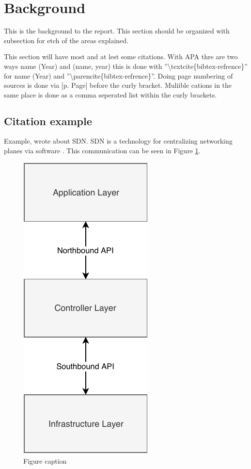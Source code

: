 
\section{Background}

This is the background to the report. This section should be organized with subsection for etch of the areas explained.

This section will have most and at lest some citations. With APA thre are two ways name (Year) and (name, year) this is done with ''\textbackslash textcite\{bibtex-refrence\}'' for name (Year) and ''\textbackslash parencite\{bibtex-refrence\}''. Doing page numbering of sources is done via [p. Page] before the curly bracket. Muliible cations in the same place is done as a comma seperated list within the curly brackets.




\subsection{Citation example}
Example, \textcite[p. 321]{ieeeSDN} wrote about SDN. SDN is a technology for centralizing networking planes via software \parencites[p. 123]{RoadtoieeeSDN}[p. 123]{ieeeSDN, Roadto}. This communication can be seen in Figure \ref{figureRefenceName}.


\begin{figure}[h]
	\centering
	\includegraphics[width=0.25 \textwidth]{./pics/APIlayers.pdf}
	\caption{Figure caption}
    \label{figureRefenceName}
\end{figure}





